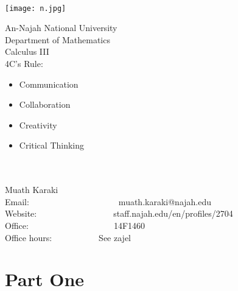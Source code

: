 \documentclass[12pt,fleqn]{book}
\begin{document}
\begingroup
\thispagestyle{empty}
\vfill
\endgroup
\newpage
~\vfill
\thispagestyle{empty}
\begin{minipage}{0.25\textwidth}
\texttt{[image: n.jpg]}
\end{minipage}
\begin{minipage}{0.7\textwidth}
{\huge An-Najah National University}\\
{\large Department of Mathematics}\\
{\Large Calculus III}\\
4C's Rule:\begin{itemize}
    \item Communication
    \item Collaboration
    \item Creativity
    \item Critical Thinking
\end{itemize}
\end{minipage}\\ \\
{\Large Muath Karaki}\\
Email:~~~~~~~~~~~~~~~~~~~~~muath.karaki@najah.edu\\
Website:~~~~~~~~~~~~~~~~~~staff.najah.edu/en/profiles/2704\\
Office:~~~~~~~~~~~~~~~~~~~~14F1460\\
Office hours:~~~~~~~~~~~See zajel
\newpage
\pagestyle{empty}
\tableofcontents 
\cleardoublepage 
\pagestyle{fancy}
\part{Part One}

\end{document}
